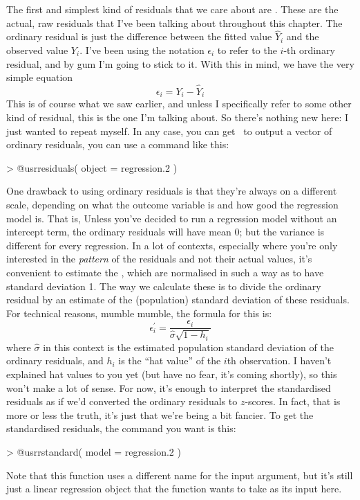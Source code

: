 The first and simplest kind of residuals that we care about are . These are the actual, raw residuals that I've been talking about throughout this chapter. The ordinary residual is just the difference between the fitted value $\hat{Y}_i$ and the observed value $Y_i$. I've been using the notation $\epsilon_i$ to refer to the $i$-th ordinary residual, and by gum I'm going to stick to it. With this in mind, we have the very simple equation
$$
\epsilon_i = Y_i - \hat{Y}_i
$$
This is of course what we saw earlier, and unless I specifically refer to some other kind of residual, this is the one I'm talking about. So there's nothing new here: I just wanted to repeat myself. In any case, you can get \R\ to output a vector of ordinary residuals, you can use a command like this:
\begin{rblock1}
> @usr{residuals( object = regression.2 )}
\end{rblock1}

One drawback to using ordinary residuals is that they're always on a different scale, depending on what the outcome variable is and how good the regression model is. That is, Unless you've decided to run a regression model without an intercept term, the ordinary residuals will have mean 0; but the variance is different for every regression. In a lot of contexts, especially where you're only interested in the {\it pattern} of the residuals and not their actual values, it's convenient to estimate the , which are normalised in such a way as to have standard deviation 1. The way we calculate these is to divide the ordinary residual by an estimate of the (population) standard deviation of these residuals. For technical reasons, mumble mumble, the formula for this is:
$$
\epsilon_{i}^\prime = \frac{\epsilon_i}{\hat{\sigma} \sqrt{1-h_i}}
$$
where $\hat\sigma$ in this context is the estimated population standard deviation of the ordinary residuals, and $h_i$ is the ``hat value'' of the $i$th observation. I haven't explained hat values to you yet (but have no fear, it's coming shortly), so this won't make a lot of sense. For now, it's enough to interpret the standardised residuals as if we'd converted the ordinary residuals to $z$-scores. In fact, that is more or less the truth, it's just that we're being a bit fancier. To get the standardised residuals, the command you want is this:
\begin{rblock1}
> @usr{rstandard( model = regression.2 )}
\end{rblock1}
Note that this function uses a different name for the input argument, but it's still just a linear regression object that the function wants to take as its input here.

